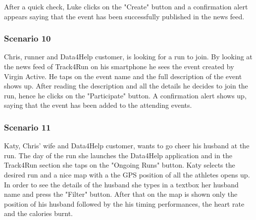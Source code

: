 After a quick check, Luke clicks on the "Create" button and a confirmation alert appears saying that the event has been successfully published in the news feed.
\subsubsection{Scenario 10}
Chris, runner and Data4Help customer, is looking for a run to join. By looking at the  news feed of Track4Run on his smartphone he sees the event created by Virgin Active. He taps on the event name and the full description of the event shows up. After reading the description and all the details he decides to join the run, hence he clicks on the "Participate" button. A confirmation alert shows up, saying that the event has been added to the attending events.
\subsubsection{Scenario 11}
Katy, Chris' wife and Data4Help customer,  wants to go cheer his husband at the run. The day of the run she launches the Data4Help application and in the Track4Run section she taps on the "Ongoing Runs" button. Katy selects the desired run and a nice map with a the GPS position of all the athletes opens up. In order to see the details of the husband she types in a textbox her husband name and press the "Filter" button. After that on the map is shown only the position of his husband followed by the his timing performances, the heart rate and the calories burnt.
 

